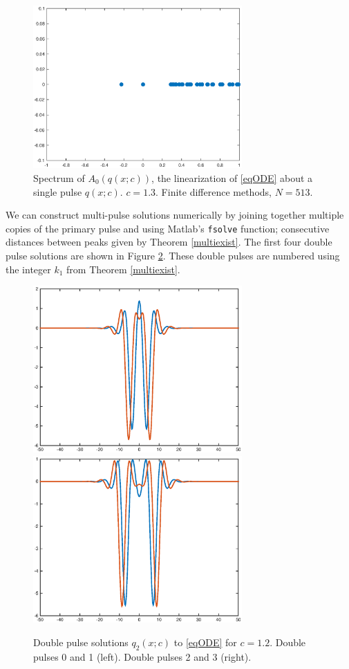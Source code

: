 \documentclass[12pt]{article}
\begin{document}
\begin{figure}[H]
\centering
\includegraphics[width=8cm]{specA0.eps}
\caption{Spectrum of $A_0(q(x; c))$, the linearization of \eqref{eqODE} about a single pulse $q(x;c)$. $c = 1.3$. Finite difference methods, $N = 513$.}
\label{fig:specA0}
\end{figure}

We can construct multi-pulse solutions numerically by joining together multiple copies of the primary pulse and using Matlab's \texttt{fsolve} function; consecutive distances between peaks given by Theorem \ref{multiexist}. The first four double pulse solutions are shown in Figure \ref{fig:double}. These double pulses are numbered using the integer $k_1$ from Theorem \ref{multiexist}.

\begin{figure}[H]
\centering
\includegraphics[width=8cm]{double12_12.eps}
\includegraphics[width=8cm]{double12_34.eps}
\caption{Double pulse solutions $q_2(x; c)$ to \eqref{eqODE} for $c = 1.2$. Double pulses 0 and 1 (left). Double pulses 2 and 3 (right).}
\label{fig:double}
\end{figure}
\end{document}
